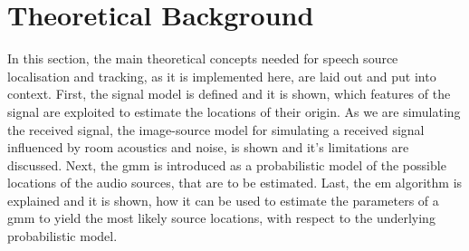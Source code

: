 \chapter{Theoretical Background}
\label{chap:2theory}

In this section, the main theoretical concepts needed for speech source localisation and tracking, as it is implemented here, are laid out and put into context. First, the signal model is defined and it is shown, which features of the signal are exploited to estimate the locations of their origin. As we are simulating the received signal, the image-source model for simulating a received signal influenced by room acoustics and noise, is shown and it's limitations are discussed. Next, the \gls{gmm} is introduced as a probabilistic model of the possible locations of the audio sources, that are to be estimated. Last, the \gls{em} algorithm is explained and it is shown, how it can be used to estimate the parameters of a \gls{gmm} to yield the most likely source locations, with respect to the underlying probabilistic model.